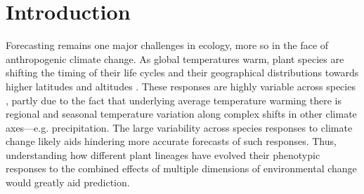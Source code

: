 \documentclass{article}\usepackage[]{graphicx}\usepackage[]{color}
\begin{document}



\section*{Introduction}

Forecasting remains one major challenges in ecology, more so in the face of anthropogenic climate change. As global temperatures warm, plant species are shifting the timing of their life cycles \citep{} and their geographical distributions towards higher latitudes and altitudes \citep{}. These responses are highly variable across species \citep{}, partly due to the fact that underlying average temperature warming there is regional and seasonal temperature variation along complex shifts in other climate axes---e.g. precipitation. The large variability across species responses to climate change likely aids hindering more accurate forecasts of such responses. Thus, understanding how different plant lineages have evolved their phenotypic responses to the combined effects of multiple dimensions of environmental change would greatly aid prediction.\\ %
\end{document}
